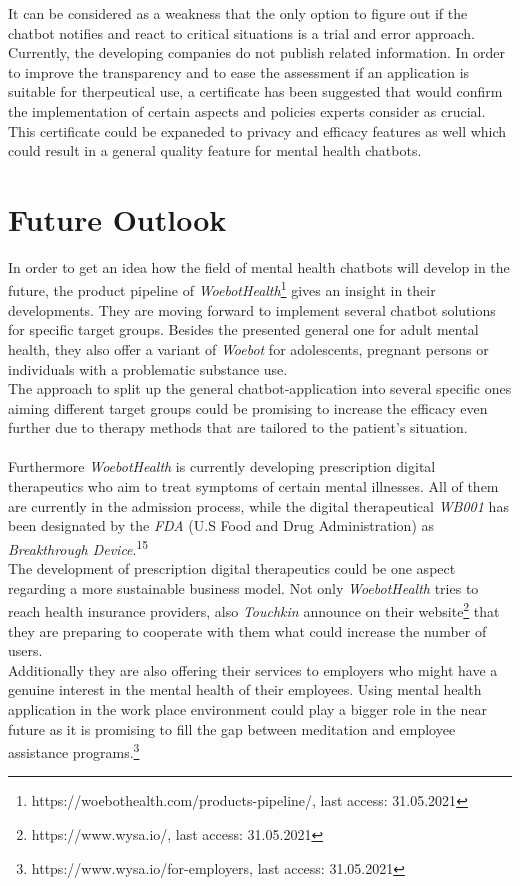 \documentclass[sigconf, nonacm]{acmart}
\begin{document}
It can be considered as a weakness that the only option to figure out if the chatbot notifies and react to critical situations is a trial and error approach. Currently, the developing companies do not publish related information. In order to improve the transparency and to ease the assessment if an application is suitable for therpeutical use, a certificate has been suggested that would confirm the implementation of certain aspects and policies experts consider as crucial.
This certificate could be expaneded to privacy and efficacy features as well which could result in a general quality feature for mental health chatbots.

\section{Future Outlook}
In order to get an idea how the field of mental health chatbots will develop in the future, the product pipeline of \emph{WoebotHealth}\footnote{https://woebothealth.com/products-pipeline/, last access: 31.05.2021} gives an insight in their developments. They are moving forward to implement several chatbot solutions for specific target groups. Besides the presented general one for adult mental health, they also offer a variant of \emph{Woebot} for adolescents, pregnant persons or 
individuals with a problematic substance use.
\\
The approach to split up the general chatbot-application into several specific ones aiming different target groups could be promising to increase the efficacy even further due to therapy methods that are tailored to the patient's situation. 
\\\\
Furthermore \emph{WoebotHealth} is currently developing prescription digital therapeutics who aim to treat symptoms of certain mental illnesses. All of them are currently in the admission process, while the digital therapeutical \emph{WB001} has been designated by the \emph{FDA} (U.S Food and Drug Administration) as \emph{Breakthrough Device}.\textsuperscript{15}
\\
The development of prescription digital therapeutics could be one aspect regarding a more sustainable business model. Not only \emph{WoebotHealth} tries to reach health insurance providers, also \emph{Touchkin} announce on their website\footnote{https://www.wysa.io/, last access: 31.05.2021} that they are preparing to cooperate with them what could increase the number of users.
\\
Additionally they are also offering their services to employers who might have a genuine interest in the mental health of their employees. Using mental health application in the work place environment could play a bigger role in the near future as it is promising to fill the gap between meditation and employee assistance programs.\footnote{https://www.wysa.io/for-employers, last access: 31.05.2021}
\end{document}
